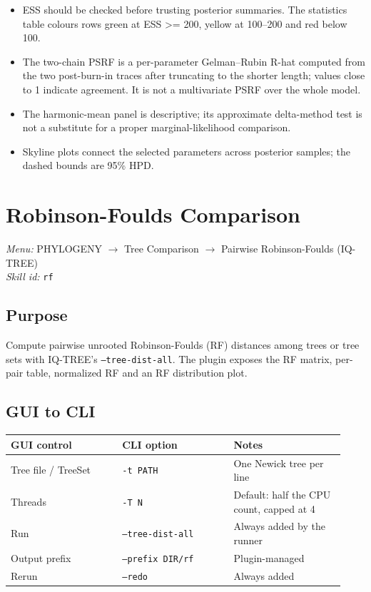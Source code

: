 \documentclass[11pt]{report}
\begin{document}
\begin{itemize}
  \item ESS should be checked before trusting posterior summaries. The statistics table colours rows green at ESS >= 200, yellow at 100--200 and red below 100.
  \item The two-chain PSRF is a per-parameter Gelman--Rubin R-hat computed from the two post-burn-in traces after truncating to the shorter length; values close to 1 indicate agreement. It is not a multivariate PSRF over the whole model.
  \item The harmonic-mean panel is descriptive; its approximate delta-method test is not a substitute for a proper marginal-likelihood comparison.
  \item Skyline plots connect the selected parameters across posterior samples; the dashed bounds are 95\% HPD.
\end{itemize}


\section{Robinson-Foulds Comparison}
\noindent\textit{Menu:} PHYLOGENY $\rightarrow$ Tree Comparison $\rightarrow$ Pairwise Robinson-Foulds (IQ-TREE)\\
\noindent\textit{Skill id:} \texttt{rf}

\subsection{Purpose}

Compute pairwise unrooted Robinson-Foulds (RF) distances among trees or tree sets with IQ-TREE's \texttt{--tree-dist-all}. The plugin exposes the RF matrix, per-pair table, normalized RF and an RF distribution plot.

\subsection{GUI to CLI}

{\footnotesize
\begin{longtable}{@{}>{\raggedright\arraybackslash}p{0.31\linewidth}>{\raggedright\arraybackslash}p{0.31\linewidth}>{\raggedright\arraybackslash}p{0.31\linewidth}@{}}
\toprule
GUI control & CLI option & Notes \\
\midrule
\endhead
Tree file / TreeSet & \texttt{-t PATH} & One Newick tree per line \\
Threads & \texttt{-T N} & Default: half the CPU count, capped at 4 \\
Run & \texttt{--tree-dist-all} & Always added by the runner \\
Output prefix & \texttt{--prefix DIR/\allowbreak rf} & Plugin-managed \\
Rerun & \texttt{--redo} & Always added \\
\bottomrule
\end{longtable}
}
\end{document}
